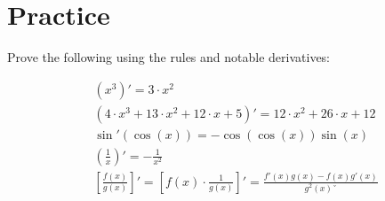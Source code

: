 \documentclass{article}
\begin{document}
\section*{Practice}

Prove the following using the rules and notable derivatives:

\begin{align*}
	&(x^3)' = 3 \cdot x^2 \\
	&(4\cdot x^3 + 13 \cdot x^2 + 12 \cdot x + 5)' = 12\cdot x^2 + 26 \cdot x + 12 \\
	&\sin'(\cos(x)) = -\cos(\cos(x))\sin(x)	\\
	&(\frac{1}{x})'=-\frac{1}{x^2} \\
	&\left[\frac{f(x)}{g(x)}\right]' =  \left[f(x) \cdot \frac{1}{g(x)}\right]' = \frac{f'(x)g(x) - f(x)g'(x)}{g^2(x)ˇ}
\end{align*}
\end{document}

